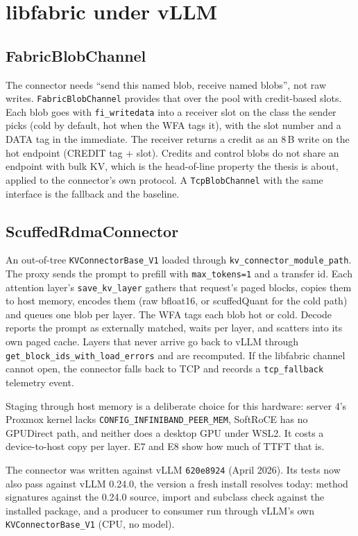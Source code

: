 \documentclass[11pt,letterpaper]{article}
\begin{document}
\section{libfabric under vLLM}

\subsection{FabricBlobChannel}
The connector needs ``send this named blob, receive named blobs'', not raw writes. \texttt{FabricBlobChannel} provides that over the pool with credit-based slots. Each blob goes with \texttt{fi\_writedata} into a receiver slot on the class the sender picks (cold by default, hot when the WFA tags it), with the slot number and a DATA tag in the immediate. The receiver returns a credit as an 8\,B write on the hot endpoint (CREDIT tag + slot). Credits and control blobs do not share an endpoint with bulk KV, which is the head-of-line property the thesis is about, applied to the connector's own protocol. A \texttt{TcpBlobChannel} with the same interface is the fallback and the baseline.

\subsection{ScuffedRdmaConnector}
An out-of-tree \texttt{KVConnectorBase\_V1} loaded through \texttt{kv\_connector\_module\_path}. The proxy sends the prompt to prefill with \texttt{max\_tokens=1} and a transfer id. Each attention layer's \texttt{save\_kv\_layer} gathers that request's paged blocks, copies them to host memory, encodes them (raw bfloat16, or scuffedQuant for the cold path) and queues one blob per layer. The WFA tags each blob hot or cold. Decode reports the prompt as externally matched, waits per layer, and scatters into its own paged cache. Layers that never arrive go back to vLLM through \texttt{get\_block\_ids\_with\_load\_errors} and are recomputed. If the libfabric channel cannot open, the connector falls back to TCP and records a \texttt{tcp\_fallback} telemetry event.

Staging through host memory is a deliberate choice for this hardware: server 4's Proxmox kernel lacks \texttt{CONFIG\_INFINIBAND\_PEER\_MEM}, SoftRoCE has no GPUDirect path, and neither does a desktop GPU under WSL2. It costs a device-to-host copy per layer. E7 and E8 show how much of TTFT that is.

The connector was written against vLLM \texttt{620e8924} (April 2026). Its tests now also pass against vLLM 0.24.0, the version a fresh install resolves today: method signatures against the 0.24.0 source, import and subclass check against the installed package, and a producer to consumer run through vLLM's own \texttt{KVConnectorBase\_V1} (CPU, no model).
\end{document}
